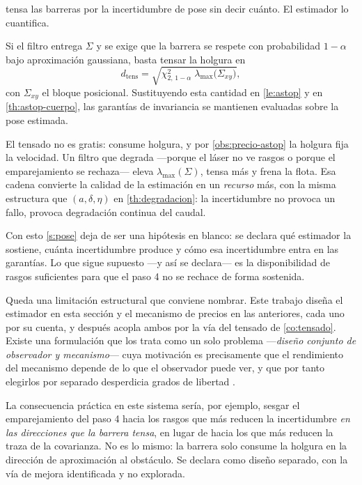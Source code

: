  tensa las barreras por la incertidumbre de pose sin decir cuánto.
El estimador lo cuantifica.

\begin{corolario}
\label{co:tensado}
Si el filtro entrega $\Sigma$ y se exige que la barrera se respete con
probabilidad $1-\alpha$ bajo aproximación gaussiana, basta tensar la holgura en
\[
  d_{\mathrm{tens}}=\sqrt{\chi^2_{2,\,1-\alpha}\;\lambda_{\max}\bigl(\Sigma_{xy}\bigr)},
\]
con $\Sigma_{xy}$ el bloque posicional. Sustituyendo esta cantidad en
\cref{le:astop} y en \cref{th:astop-cuerpo}, las garantías de invariancia se
mantienen evaluadas sobre la pose estimada.
\end{corolario}

\begin{observacion}
\label{obs:tensado-coste}
El tensado no es gratis: consume holgura, y por \cref{obs:precio-astop} la
holgura fija la velocidad. Un filtro que degrada —porque el láser no ve rasgos o
porque el emparejamiento se rechaza— eleva $\lambda_{\max}(\Sigma)$, tensa más y
frena la flota. Esa cadena convierte la calidad de la estimación en un
\emph{recurso} más, con la misma estructura que $(a,\delta,\eta)$ en
\cref{th:degradacion}: la incertidumbre no provoca un fallo, provoca degradación
continua del caudal.

Con esto \cref{s:pose} deja de ser una hipótesis en blanco: se declara qué
estimador la sostiene, cuánta incertidumbre produce y cómo esa incertidumbre
entra en las garantías. Lo que sigue supuesto —y así se declara— es la
disponibilidad de rasgos suficientes para que el paso 4 no se rechace de forma
sostenida.
\end{observacion}

\begin{observacion}
\label{obs:observador-mecanismo}
Queda una limitación estructural que conviene nombrar. Este trabajo diseña el
estimador en esta sección y el mecanismo de precios en las anteriores, cada uno
por su cuenta, y después acopla ambos por la vía del tensado de
\cref{co:tensado}. Existe una formulación que los trata como un solo problema
—\emph{diseño conjunto de observador y mecanismo}— cuya motivación es
precisamente que el rendimiento del mecanismo depende de lo que el observador
puede ver, y que por tanto elegirlos por separado desperdicia grados de libertad
\cite{clempner2024optimization}.

La consecuencia práctica en este sistema sería, por ejemplo, sesgar el
emparejamiento del paso 4 hacia los rasgos que más reducen la incertidumbre
\emph{en las direcciones que la barrera tensa}, en lugar de hacia los que más
reducen la traza de la covarianza. No es lo mismo: la barrera solo consume la
holgura en la dirección de aproximación al obstáculo. Se declara como diseño
separado, con la vía de mejora identificada y no explorada.
\end{observacion}
